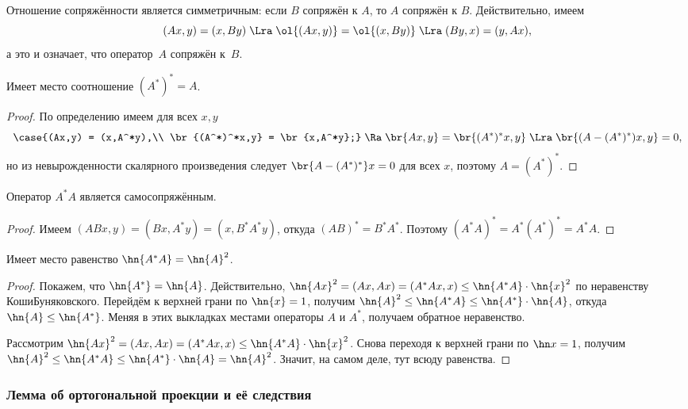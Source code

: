 \documentclass[a4paper]{article}
\begin{document}
Отношение сопряжённости является симметричным: если $B$ сопряжён к $A$, то $A$ сопряжён к $B$.
Действительно, имеем
$$(Ax,y) = (x,By) \; \Lra \; \ol{(Ax,y)} = \ol{(x,By)} \; \Lra \; (By,x) = (y,Ax),$$
а это и означает, что оператор~$A$ сопряжён к~$B$.

\begin{stm}
Имеет место соотношение $(A^*)^* = A$.
\end{stm}
\begin{proof}
По определению имеем для всех $x,y$
$$\case{(Ax,y) = (x,A^*y),\\ \br{(A^*)^*x,y} = \br{x,A^*y};} \;\Ra \; \br{Ax,y} = \br{(A^*)^*x,y}
\; \Lra \; \br{(A-(A^*)^*)x, y} = 0,$$
но из невырожденности скалярного произведения следует $\br{A-(A^*)^*}x = 0$ для всех $x$,
поэтому $A = (A^*)^*$.
\end{proof}

\begin{stm}
Оператор $A^*A$ является самосопряжённым.
\end{stm}
\begin{proof}
Имеем $(ABx,y) = (Bx,A^*y) = (x,B^*A^*y)$, откуда $(AB)^* = B^*A^*$. Поэтому
$(A^*A)^* = A^*(A^*)^* = A^*A$.
\end{proof}

\begin{lemma}
Имеет место равенство $\hn{A^*A} = \hn{A}^2$.
\end{lemma}
\begin{proof}
Покажем, что $\hn{A^*} = \hn{A}$. Действительно, $\hn{Ax}^2 = (Ax,Ax) = (A^*Ax,x) \le \hn{A^*A}\cdot\hn{x}^2$
по неравенству Коши\ч Буняковского.
Перейдём к верхней грани по $\hn{x} = 1$, получим
$\hn{A}^2 \le \hn{A^*A} \le \hn{A^*} \cdot \hn{A}$, откуда $\hn{A} \le \hn{A^*}$.
Меняя в этих выкладках местами операторы $A$ и $A^*$, получаем обратное неравенство.

Рассмотрим $\hn{Ax}^2 = (Ax,Ax) = (A^*Ax,x) \le \hn{A^*A}\cdot\hn{x}^2$. Снова
переходя к верхней грани по $\hn x = 1$, получим
$\hn{A}^2 \le \hn{A^*A} \le \hn{A^*} \cdot\hn{A} =  \hn{A}^2$. Значит, на самом деле,
тут всюду равенства.
\end{proof}

\subsubsection{Лемма об ортогональной проекции и её следствия}
\end{document}
